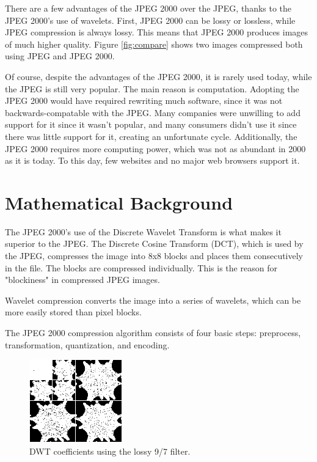 \documentclass[titlepage,12pt]{article}
\begin{document}
There are a few advantages of the JPEG 2000 over the JPEG,
thanks to the JPEG 2000's use of wavelets.
First, JPEG 2000 can be lossy or lossless, while JPEG compression is always lossy.
This means that JPEG 2000 produces images of much higher quality.
Figure \ref{fig:compare} shows two images compressed both using JPEG and JPEG 2000.

Of course, despite the advantages of the JPEG 2000, it is rarely used today, 
while the JPEG is still very popular.
The main reason is computation.\cite{alternative} 
Adopting the JPEG 2000 would have required rewriting much software, 
since it was not backwards-compatable with the JPEG.
Many companies were unwilling to add support for it since it wasn't popular,
and many consumers didn't use it since there was little support for it,
creating an unfortunate cycle. 
Additionally, the JPEG 2000 requires more computing power, which was not as abundant in 2000 as it is today.
To this day, few websites and no major web browsers support it.


\section{Mathematical Background}

The JPEG 2000's use of the Discrete Wavelet Transform is what makes it superior to the JPEG.\cite{how}
The Discrete Cosine Transform (DCT), which is used by the JPEG, compresses the image into 8x8 blocks
and places them consecutively in the file.
The blocks are compressed individually.
This is the reason for "blockiness" in compressed JPEG images.

Wavelet compression converts the image into a series of wavelets, which can be more easily stored than pixel blocks.

The JPEG 2000 compression algorithm consists of four basic steps: 
preprocess, transformation, quantization, and encoding\cite{whydomath}.

\begin{figure}[h]
	\centering
	\includegraphics[scale=0.6]{resources/lossybaby.png}
	\caption{DWT coefficients using the lossy 9/7 filter.}
	\label{fig:lossybaby}
\end{figure}
\end{document}
